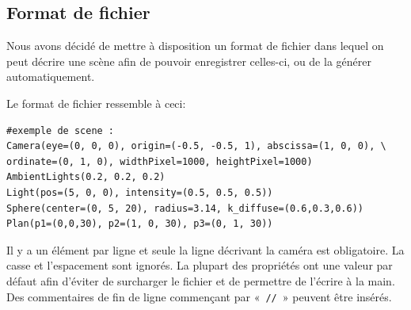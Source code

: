 \documentclass[a4paper]{article}
\begin{document}
  \subsection{Format de fichier}
    Nous avons décidé de mettre à disposition un format de fichier dans lequel
    on peut décrire une scène afin de pouvoir enregistrer celles-ci, ou de la
    générer automatiquement.

    Le format de fichier ressemble à ceci:
    \begin{lstlisting}
#exemple de scene :
Camera(eye=(0, 0, 0), origin=(-0.5, -0.5, 1), abscissa=(1, 0, 0), \
ordinate=(0, 1, 0), widthPixel=1000, heightPixel=1000)
AmbientLights(0.2, 0.2, 0.2)
Light(pos=(5, 0, 0), intensity=(0.5, 0.5, 0.5))
Sphere(center=(0, 5, 20), radius=3.14, k_diffuse=(0.6,0.3,0.6))
Plan(p1=(0,0,30), p2=(1, 0, 30), p3=(0, 1, 30))
    \end{lstlisting}

    Il y a un élément par ligne et seule la ligne décrivant la caméra est
    obligatoire. La casse et l'espacement sont ignorés. La plupart des
    propriétés ont une valeur par défaut afin d'éviter de surcharger le
    fichier et de permettre de l'écrire à la main. Des commentaires de fin de
    ligne commençant par «~\verb+//+~» peuvent être insérés.
\end{document}
